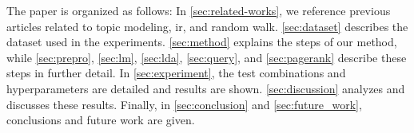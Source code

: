The paper is organized as follows:
In \autoref{sec:related-works}, we reference previous articles related to topic modeling, \gls{ir}, and random walk.
\autoref{sec:dataset} describes the dataset used in the experiments.
\autoref{sec:method} explains the steps of our method, while \autoref{sec:prepro}, \autoref{sec:lm}, \autoref{sec:lda}, \autoref{sec:query}, and \autoref{sec:pagerank} describe these steps in further detail.
In \autoref{sec:experiment}, the test combinations and hyperparameters are detailed and results are shown.
\autoref{sec:discussion} analyzes and discusses these results.
Finally, in \autoref{sec:conclusion} and \autoref{sec:future_work}, conclusions and future work are given.
